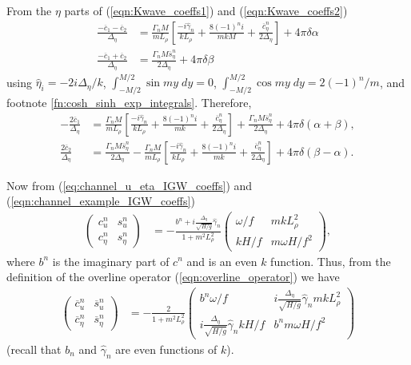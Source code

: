 \documentclass[10pt,reqno]{amsart}
\begin{document}
From the $\eta$ parts of (\ref{eqn:Kwave_coeffs1}) and (\ref{eqn:Kwave_coeffs2})
\begin{align}
\frac{- \overline{c}_1 - \overline{c}_2}{\Delta_\eta} & =
\frac{\Gamma_n M}{m L_\rho}
\left[
 \frac{- i \hat{\gamma}_n }{k L_\rho} + \frac{8 (-1)^n i }{m k M}
+
\frac{\overline{c}_\eta^{n}}{2\Delta_\eta} \right]  
+ 4 \pi \delta \alpha\\
\frac{- \overline{c}_1 + \overline{c}_2}{\Delta_\eta} &= \frac{\Gamma_n M \overline{s}_\eta^n}{2 \Delta_\eta} + 4 \pi \delta \beta
\end{align}
using $\hat{\eta}_i = - 2 i \Delta_\eta / k$, $\int_{-M/2}^{M/2} \sin m y \; d y = 0$, $\int_{-M/2}^{M/2} \cos m y \; d y = 2 (-1)^n /m$, and footnote \ref{fn:cosh_sinh_exp_integrals}.
Therefore, 
\begin{align}
-\frac{2 \overline{c}_1}{\Delta_\eta} & = \frac{ \Gamma_n M}{m L_\rho}
\left[
 \frac{-i \hat{\gamma}_n}{k L_\rho} + \frac{8 (-1)^n i }{m k}
+
\frac{\overline{c}_\eta^{n}}{2 \Delta_\eta} \right]  +
\frac{ \Gamma_n M \overline{s}_\eta^n}{2 \Delta_\eta} 
+ 4 \pi \delta \left( \alpha + \beta \right)
, \label{eqn:c1_eta} \\
\frac{2 \overline{c}_2}{\Delta_\eta}  &= 
\frac{ \Gamma_n M \overline{s}_\eta^n}{2 \Delta_\eta}
-
\frac{ \Gamma_n M}{m L_\rho}
\left[ \frac{-i \hat{\gamma}_n }{k L_\rho} + \frac{8 (-1)^n i }{m k}
+
\frac{\overline{c}_\eta^{n}}{2 \Delta_\eta} \right] 
+ 4 \pi \delta \left(\beta - \alpha \right)
 \label{eqn:c2_eta} .
\end{align}

Now from (\ref{eq:channel_u_eta_IGW_coeffs}) and (\ref{eqn:channel_example_IGW_coeffs})
\begin{align}
\begin{pmatrix}
c_u^n & s_u^n  \\
c_\eta^n & s_\eta^n
\end{pmatrix} & =
- \frac{b^n + i \frac{\Delta_\eta}{\sqrt{H/g}} \hat{\gamma}_n }{1 + m^2 L_\rho^2}
\begin{pmatrix}
\omega / f & m k L_\rho^2 \\
k H/f  & m \omega H / f^2 
\end{pmatrix} ,
\end{align}
where $b^n$ is the imaginary part of $c^n$ and is an even $k$ function.
Thus, from the definition of the overline operator (\ref{eqn:overline_operator}) we have
\begin{align}
\begin{pmatrix}
\overline{c}_u^n & \overline{s}_u^n  \\
\overline{c}_\eta^n & \overline{s}_\eta^n
\end{pmatrix} & =
- \frac{2}{1 + m^2 L_\rho^2}
\begin{pmatrix}
b^n \omega / f & i \frac{\Delta_\eta}{\sqrt{H/g}} \hat{\gamma}_n m k L_\rho^2 \\
i \frac{\Delta_\eta}{\sqrt{H/g}} \hat{\gamma}_n k H/f  & b^n m \omega H / f^2 
\end{pmatrix} 
\label{eqn:channel_eg_IGW_u_eta_coeffs}
\end{align}
(recall that $b_n$ and $\hat{\gamma}_n$ are even functions of $k$).
\end{document}
